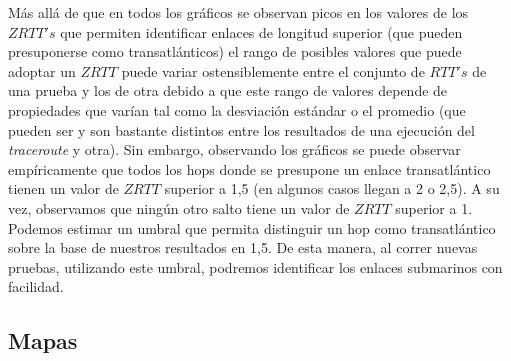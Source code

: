 Más allá de que en todos los gráficos se observan picos en los valores de los $ZRTT's$ que permiten identificar enlaces de longitud superior (que pueden presuponerse como transatlánticos) el rango de posibles valores que puede adoptar un $ZRTT$ puede variar ostensiblemente entre el conjunto de $RTT's$ de una prueba y los de otra debido a que este rango de valores depende de propiedades que varían tal como la desviación estándar o el promedio (que pueden ser y son bastante distintos entre los resultados de una ejecución del \textit{traceroute} y otra). Sin embargo, observando los gráficos se puede observar empíricamente que todos los hops donde se presupone un enlace transatlántico tienen un valor de $ZRTT$ superior a 1,5 (en algunos casos llegan a 2 o 2,5). A su vez, observamos que ningún otro salto tiene un valor de $ZRTT$ superior a 1. Podemos estimar un umbral que permita distinguir un hop como transatlántico sobre la base de nuestros resultados en 1,5. De esta manera, al correr nuevas pruebas, utilizando este umbral, podremos identificar los enlaces submarinos con facilidad.

\subsection{Mapas}

